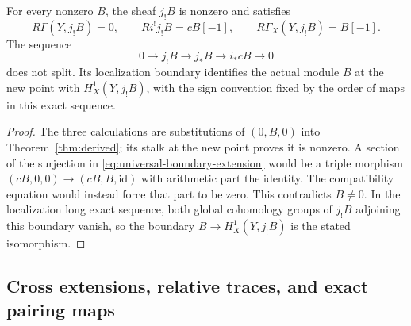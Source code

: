 \begin{corollary}
\label{cor:boundary}
For every nonzero $B$, the sheaf $j_!B$ is nonzero and satisfies
\[
 R\Gamma(Y,j_!B)=0,\qquad Ri^!j_!B=cB[-1],\qquad
 R\Gamma_X(Y,j_!B)=B[-1].
 \tag{RP10}\label{eq:boundary-object}
\]
The sequence
\[
 0\longrightarrow j_!B\longrightarrow j_*B
 \longrightarrow i_*cB\longrightarrow0
 \tag{RP11}\label{eq:universal-boundary-extension}
\]
does not split. Its localization boundary identifies the actual module
$B$ at the new point with $H^1_X(Y,j_!B)$, with the sign convention
fixed by the order of maps in this exact sequence.
\end{corollary}
\begin{proof}
The three calculations are substitutions of $(0,B,0)$ into
Theorem~\ref{thm:derived}; its stalk at the new point proves it is
nonzero. A section of the surjection in
\eqref{eq:universal-boundary-extension} would be a triple morphism
$(cB,0,0)\to(cB,B,\mathrm{id})$ with arithmetic part the identity.
The compatibility equation would instead force that part to be zero.
This contradicts $B\ne0$. In the localization long exact sequence,
both global cohomology groups of $j_!B$ adjoining this boundary vanish,
so the boundary $B\to H^1_X(Y,j_!B)$ is the stated isomorphism.
\end{proof}

\subsection{Cross extensions, relative traces, and exact pairing maps}

